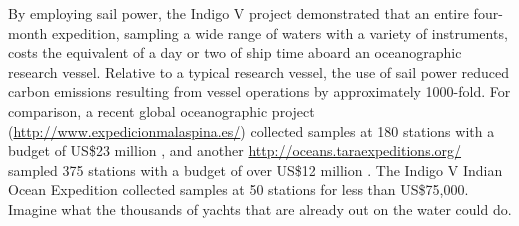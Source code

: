 By employing sail power, the Indigo V project demonstrated that an entire four-month expedition, sampling a wide range of waters with a variety of instruments, costs the equivalent of a day or two of ship time aboard an oceanographic research vessel. Relative to a typical research vessel, the use of sail power reduced carbon emissions resulting from vessel operations by approximately 1000-fold. For comparison, a recent global oceanographic project (\url{http://www.expedicionmalaspina.es/}) collected samples at 180 stations with a budget of US\$23 million \cite{malaspina, upv-ehu}, and another \url{http://oceans.taraexpeditions.org/} sampled 375 stations with a budget of over US\$12 million \cite{tara-embl, tara-2009, tara-2010, tara-2011}. The Indigo V Indian Ocean Expedition collected samples at 50 stations for less than US\$75,000. Imagine what the thousands of yachts that are already out on the water could do.